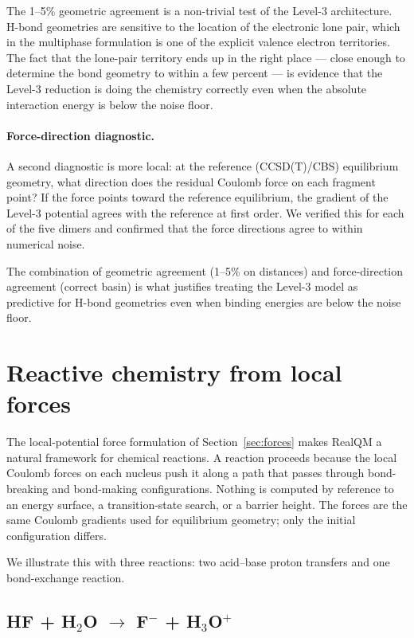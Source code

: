 The 1--5\% geometric agreement is a non-trivial test of the Level-3 architecture. H-bond geometries are sensitive to the location of the electronic lone pair, which in the multiphase formulation is one of the explicit valence electron territories. The fact that the lone-pair territory ends up in the right place --- close enough to determine the bond geometry to within a few percent --- is evidence that the Level-3 reduction is doing the chemistry correctly even when the absolute interaction energy is below the noise floor.

\paragraph{Force-direction diagnostic.}
A second diagnostic is more local: at the reference (CCSD(T)/CBS) equilibrium geometry, what direction does the residual Coulomb force on each fragment point? If the force points toward the reference equilibrium, the gradient of the Level-3 potential agrees with the reference at first order. We verified this for each of the five dimers and confirmed that the force directions agree to within numerical noise.

The combination of geometric agreement (1--5\% on distances) and force-direction agreement (correct basin) is what justifies treating the Level-3 model as predictive for H-bond geometries even when binding energies are below the noise floor.

\section{Reactive chemistry from local forces}\label{sec:reactive}

The local-potential force formulation of Section~\ref{sec:forces} makes RealQM a natural framework for chemical reactions. A reaction proceeds because the local Coulomb forces on each nucleus push it along a path that passes through bond-breaking and bond-making configurations. Nothing is computed by reference to an energy surface, a transition-state search, or a barrier height. The forces are the same Coulomb gradients used for equilibrium geometry; only the initial configuration differs.

We illustrate this with three reactions: two acid--base proton transfers and one bond-exchange reaction.

\subsection{HF + H$_2$O $\to$ F$^-$ + H$_3$O$^+$}

